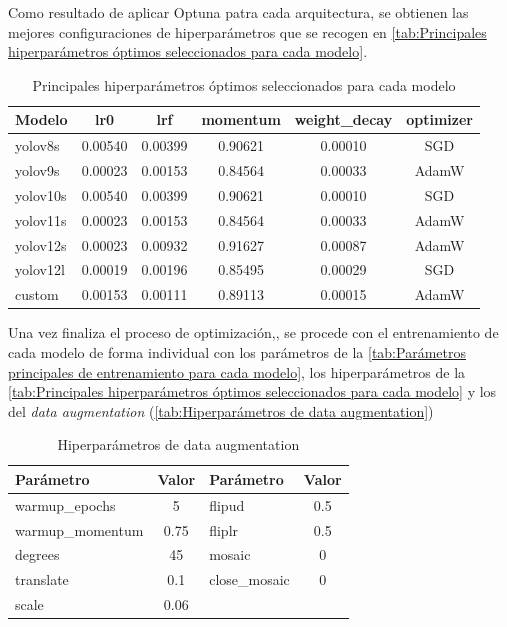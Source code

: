 \documentclass[12pt,a4paper,onecolumn,oneside]{report}
\begin{document}
Como resultado de aplicar Optuna patra cada arquitectura, se obtienen las mejores configuraciones de hiperparámetros que se recogen en \autoref{tab:Principales hiperparámetros óptimos seleccionados para cada modelo}.

\begin{table}[H]
\caption{Principales hiperparámetros óptimos seleccionados para cada modelo}
\label{tab:Principales hiperparámetros óptimos seleccionados para cada modelo}
\centering
\begin{tabular}{lccccc}
\toprule
\textbf{Modelo} & \textbf{lr0} & \textbf{lrf} & \textbf{momentum} & \textbf{weight\_decay} & \textbf{optimizer} \\
\midrule
yolov8s   & 0.00540 & 0.00399 & 0.90621 & 0.00010 & SGD \\
yolov9s   & 0.00023 & 0.00153 & 0.84564 & 0.00033 & AdamW \\
yolov10s  & 0.00540 & 0.00399 & 0.90621 & 0.00010 & SGD \\
yolov11s  & 0.00023 & 0.00153 & 0.84564 & 0.00033 & AdamW \\
yolov12s  & 0.00023 & 0.00932 & 0.91627 & 0.00087 & AdamW \\
yolov12l  & 0.00019 & 0.00196 & 0.85495 & 0.00029 & SGD \\
custom    & 0.00153 & 0.00111 & 0.89113 & 0.00015 & AdamW \\
\bottomrule
\end{tabular}
\end{table}

Una vez finaliza el proceso de optimización,, se procede con el entrenamiento de cada modelo de forma individual con los parámetros
de la \autoref{tab:Parámetros principales de entrenamiento para cada modelo}, los hiperparámetros de la \autoref{tab:Principales hiperparámetros óptimos seleccionados para cada modelo} y los del
\textit{data augmentation} (\autoref{tab:Hiperparámetros de data augmentation}) 

\begin{table}[H]
\caption{Hiperparámetros de data augmentation}
\label{tab:Hiperparámetros de data augmentation}
\centering
\begin{tabular}{lc|lc}
\toprule
\textbf{Parámetro} & \textbf{Valor} & \textbf{Parámetro} & \textbf{Valor} \\
\midrule
warmup\_epochs & 5 & flipud & 0.5 \\
warmup\_momentum & 0.75 & fliplr & 0.5 \\
degrees & 45 & mosaic & 0 \\
translate & 0.1 & close\_mosaic & 0 \\
scale & 0.06 & & \\
\bottomrule
\end{tabular}
\end{table}
\end{document}
